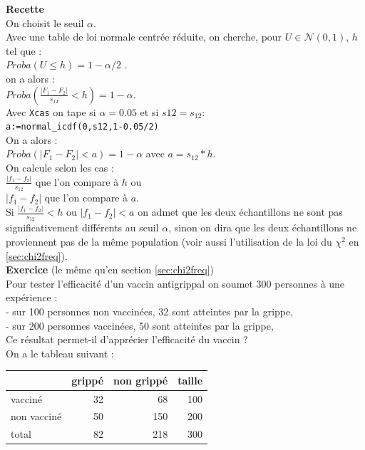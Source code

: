 \documentclass[a4paper,11pt]{book}
\begin{document}
{\bf Recette}\\
On choisit le seuil $\alpha$.\\
Avec une table de loi normale centr\'ee r\'eduite,  on cherche,
 pour  $U \in\mathcal N(0,1)$, $h$  tel que :\\
$Proba(U \leq h)=1-\alpha/2$ .\\
on a alors :\\
 $\displaystyle Proba(\frac{|F_1-F_2|}{s_{12}}<h)=1-\alpha$.\\
Avec {\tt Xcas} on tape si $\alpha=0.05$ et si $s12=s_{12}$:\\
{\tt a:=normal\_icdf(0,s12,1-0.05/2)} \\
On a alors :\\
 $\displaystyle  Proba(|F_1-F_2|<a)=1-\alpha$ avec $a=s_{12}*h$.\\
On calcule selon les cas :\\
$\displaystyle \frac{|f_1-f_2|}{s_{12}}$  que l'on compare \`a $h$ ou\\
 $|f_1-f_2|$ que l'on compare \`a $a$.\\ 
Si $\displaystyle \frac{|f_1-f_2|}{s_{12}}<h$ ou  $|f_1-f_2|<a$ on admet que les deux 
\'echantillons ne sont pas
 significativement diff\'erents au seuil $\alpha$, sinon on dira que les deux 
\'echantillons ne proviennent pas de la m\^eme population (voir aussi 
l'utilisation de la loi du $\chi^2$ en \ref{sec:chi2freq}). \\ 
{\bf Exercice} (le m\^eme qu'en section \ref{sec:chi2freq})\\
Pour tester l'efficacit\'e d'un vaccin antigrippal on soumet 300 personnes 
\`a une exp\'erience : \\
- sur 100 personnes non vaccin\'ees, 32 sont atteintes par la grippe,\\
- sur 200 personnes  vaccin\'ees, 50 sont atteintes par la grippe,\\  
Ce r\'esultat permet-il d'appr\'ecier l'efficacit\'e du vaccin ?\\
On a le tableau suivant :\\

\begin{tabular}{|l|r|r|r|}
 \hline
&gripp\'e&non gripp\'e&taille\\
\hline
vaccin\'e&32&68&100\\
\hline
non vaccin\'e& 50&150&200\\
\hline
total&82&218&300\\
\hline
\end{tabular}\\
\end{document}

